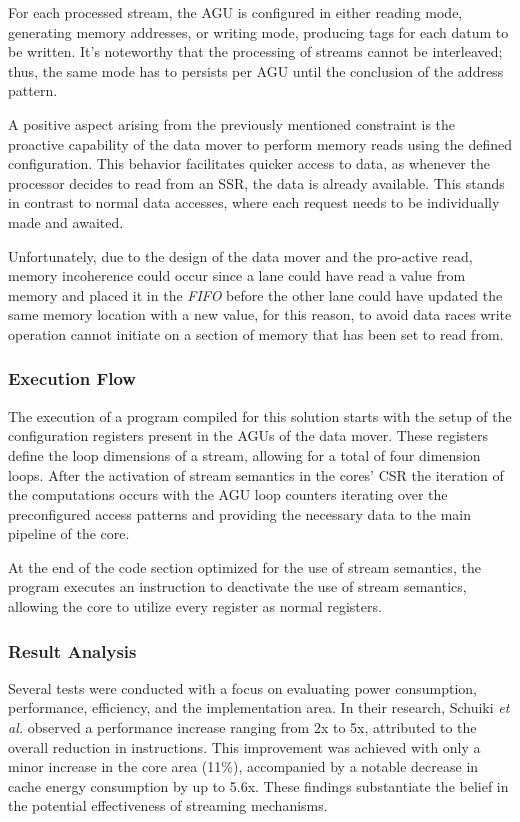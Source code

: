 For each processed stream, the AGU is configured in either reading mode, generating memory addresses, or writing mode, producing tags for each datum to be written. It's noteworthy that the processing of streams cannot be interleaved; thus, the same mode has to persists per AGU until the conclusion of the address pattern.


A positive aspect arising from the previously mentioned constraint is the proactive capability of the data mover to perform memory reads using the defined configuration. This behavior facilitates quicker access to data, as whenever the processor decides to read from an SSR, the data is already available. This stands in contrast to normal data accesses, where each request needs to be individually made and awaited.

Unfortunately, due to the design of the data mover and the pro-active read, memory incoherence could occur since a lane could have read a value from memory and placed it in the \textit{FIFO} before the other lane could have updated the same memory location with a new value, for this reason, to avoid data races write operation cannot initiate on a section of memory that has been set to read from.

\subsubsection{Execution Flow}

The execution of a program compiled for this solution starts with the setup of the configuration registers present in the AGUs of the data mover. These registers define the loop dimensions of a stream, allowing for a total of four dimension loops. After the activation of stream semantics in the cores' CSR the iteration of the computations occurs with the AGU loop counters iterating over the preconfigured access patterns and providing the necessary data to the main pipeline of the core.

At the end of the code section optimized for the use of stream semantics, the program executes an instruction to deactivate the use of stream semantics, allowing the core to utilize every register as normal registers.

\subsubsection{Result Analysis}


Several tests were conducted with a focus on evaluating power consumption, performance, efficiency, and the implementation area. In their research, Schuiki \textit{et al.} \cite{9068465} observed a performance increase ranging from 2x to 5x, attributed to the overall reduction in instructions. This improvement was achieved with only a minor increase in the core area (11\%), accompanied by a notable decrease in cache energy consumption by up to 5.6x. These findings substantiate the belief in the potential effectiveness of streaming mechanisms.

